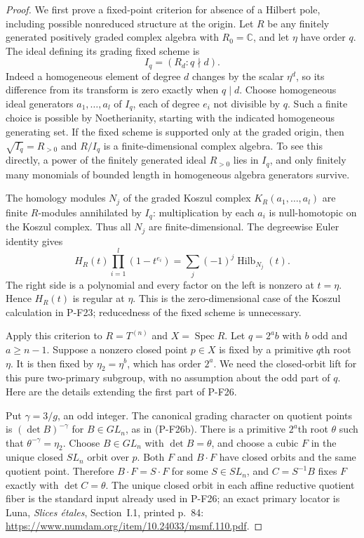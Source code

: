 \documentclass[11pt,a4paper]{article}
\begin{document}
\begin{proof}
We first prove a fixed-point criterion for absence of a Hilbert
pole, including possible nonreduced structure at the origin.
Let $R$ be any finitely generated positively graded complex
algebra with $R_0=\mathbb C$, and let $\eta$ have order $q$.
The ideal defining its grading fixed scheme is
\[
                    I_q=(R_d:q\nmid d).                     \tag{P-F56h}
\]
Indeed a homogeneous element of degree $d$ changes by
the scalar $\eta^d$, so its difference from its transform
is zero exactly when $q\mid d$.
Choose homogeneous ideal generators $a_1,\ldots,a_l$ of
$I_q$, each of degree $e_i$ not divisible by $q$.
Such a finite choice is possible by Noetherianity, starting
with the indicated homogeneous generating set.
If the fixed scheme is supported only at the graded origin,
then $\sqrt{I_q}=R_{>0}$ and $R/I_q$ is a finite-dimensional
complex algebra. To see this directly, a power of the finitely
generated ideal $R_{>0}$ lies in $I_q$, and only finitely many
monomials of bounded length in homogeneous algebra generators
survive.

The homology modules $N_j$ of the graded Koszul complex
$K_R(a_1,\ldots,a_l)$ are finite $R$-modules annihilated by
$I_q$: multiplication by each $a_i$ is null-homotopic on
the Koszul complex. Thus all $N_j$ are finite-dimensional.
The degreewise Euler identity gives
\[
 H_R(t)\prod_{i=1}^l(1-t^{e_i})
                    =\sum_j(-1)^j\operatorname{Hilb}_{N_j}(t).
 \tag{P-F56i}
\]
The right side is a polynomial and every factor on the left
is nonzero at $t=\eta$. Hence $H_R(t)$ is regular at $\eta$.
This is the zero-dimensional case of the Koszul calculation
in P-F23; reducedness of the fixed scheme is unnecessary.

Apply this criterion to $R=T^{(n)}$ and $X=\operatorname{Spec}R$.
Let $q=2^ab$ with $b$ odd and $a\ge n-1$.
Suppose a nonzero closed point $p\in X$ is fixed by a primitive
$q$th root $\eta$. It is then fixed by
$\eta_2=\eta^b$, which has order $2^a$.
We need the closed-orbit lift for this pure two-primary
subgroup, with no assumption about the odd part of $q$.
Here are the details extending the first part of P-F26.

Put $\gamma=3/g$, an odd integer. The canonical grading
character on quotient points is
$(\det B)^{-\gamma}$ for $B\in GL_n$, as in (P-F26b).
There is a primitive $2^a$th root $\theta$ such that
$\theta^{-\gamma}=\eta_2$.
Choose $B\in GL_n$ with $\det B=\theta$, and choose
a cubic $F$ in the unique closed $SL_n$ orbit over $p$.
Both $F$ and $B\cdot F$ have closed orbits and the same
quotient point. Therefore $B\cdot F=S\cdot F$ for some
$S\in SL_n$, and $C=S^{-1}B$ fixes $F$ exactly with
$\det C=\theta$.
The unique closed orbit in each affine reductive quotient
fiber is the standard input already used in P-F26; an exact
primary locator is Luna, \emph{Slices \'etales},
Section~I.1, printed p.~84:
\url{https://www.numdam.org/item/10.24033/msmf.110.pdf}.


\end{proof}
\end{document}
